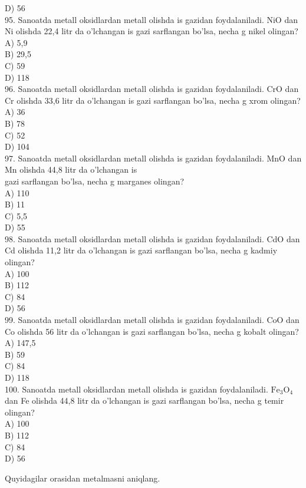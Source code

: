 D) 56\\
95. Sanoatda metall oksidlardan metall olishda is gazidan foydalaniladi. NiO dan Ni olishda 22,4 litr da o'lchangan is gazi sarflangan bo'lsa, necha g nikel olingan?\\
A) 5,9\\
B) 29,5\\
C) 59\\
D) 118\\
96. Sanoatda metall oksidlardan metall olishda is gazidan foydalaniladi. CrO dan Cr olishda 33,6 litr da o'lchangan is gazi sarflangan bo'lsa, necha g xrom olingan?\\
A) 36\\
B) 78\\
C) 52\\
D) 104\\
97. Sanoatda metall oksidlardan metall olishda is gazidan foydalaniladi. MnO dan Mn olishda 44,8 litr da o'lchangan is\\
gazi sarflangan bo'lsa, necha g marganes olingan?\\
A) 110\\
B) 11\\
C) 5,5\\
D) 55\\
98. Sanoatda metall oksidlardan metall olishda is gazidan foydalaniladi. CdO dan Cd olishda 11,2 litr da o'lchangan is gazi sarflangan bo'lsa, necha g kadmiy olingan?\\
A) 100\\
B) 112\\
C) 84\\
D) 56\\
99. Sanoatda metall oksidlardan metall olishda is gazidan foydalaniladi. CoO dan Co olishda 56 litr da o'lchangan is gazi sarflangan bo'lsa, necha g kobalt olingan?\\
A) 147,5\\
B) 59\\
C) 84\\
D) 118\\
100. Sanoatda metall oksidlardan metall olishda is gazidan foydalaniladi. $\mathrm{Fe}_{3} \mathrm{O}_{4}$ dan Fe olishda 44,8 litr da o'lchangan is gazi sarflangan bo'lsa, necha g temir olingan?\\
A) 100\\
B) 112\\
C) 84\\
D) 56
  \item Quyidagilar orasidan metalmasni aniqlang.\\
